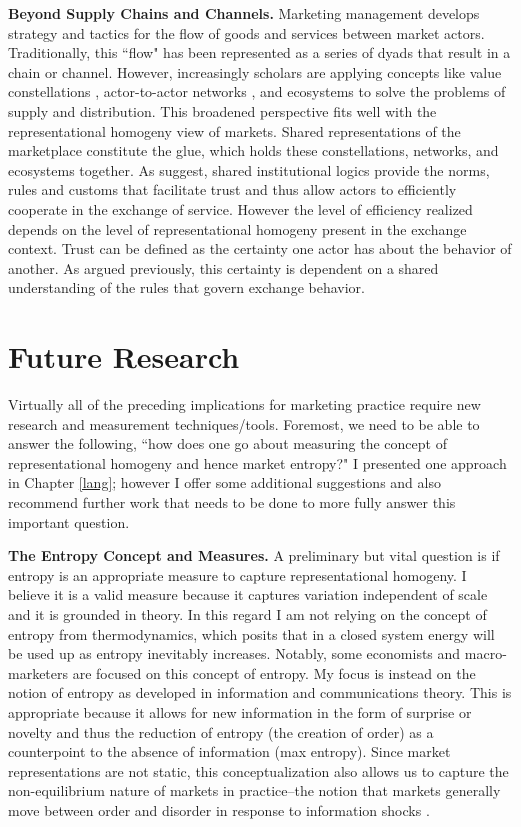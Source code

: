 \textbf{Beyond Supply Chains and Channels.}
Marketing management develops strategy and tactics for the flow of goods and services between market actors. Traditionally, this ``flow" has been represented as a series of dyads that result in a chain or channel. However, increasingly scholars are applying concepts like value constellations \citep{normann1993}, actor-to-actor networks \citep{vargo2011}, and ecosystems \citep{mars2012} to solve the problems of supply and distribution. This broadened perspective fits well with the representational homogeny view of markets. Shared representations of the marketplace constitute the glue, which holds these constellations, networks, and ecosystems together. As \citet{vargo2011} suggest, shared institutional logics provide the norms, rules and customs that facilitate trust and thus allow actors to efficiently cooperate in the exchange of service. However the level of efficiency realized depends on the level of representational homogeny present in the exchange context. Trust can be defined as the certainty one actor has about the behavior of another. As argued previously, this certainty is dependent on a shared understanding of the rules that govern exchange behavior. 

\section{Future Research}
Virtually all of the preceding implications for marketing practice require new research and measurement techniques/tools. Foremost, we need to be able to answer the following, ``how does one go about measuring the concept of representational homogeny and hence market entropy?" I presented one approach in Chapter \ref{lang}; however I offer some additional suggestions and also recommend further work that needs to be done to more fully answer this important question. 

\textbf{The Entropy Concept and Measures.}
A preliminary but vital question is if entropy is an appropriate measure to capture representational homogeny. I believe it is a valid measure because it captures variation independent of scale and it is grounded in theory. In this regard I am not relying on the concept of entropy from thermodynamics, which posits that in a closed system energy will be used up as entropy inevitably increases. Notably, some economists \citep[see e.g.][]{georgescu1971, rifkin1980} and macro-marketers \citep{kilbourne1997} are focused on this concept of entropy. My focus is instead on the notion of entropy as developed in information and communications theory. This is appropriate because it allows for new information in the form of surprise or novelty and thus the reduction of entropy (the creation of order) as a counterpoint to the absence of information (max entropy). Since market representations are not static, this conceptualization also allows us to capture the non-equilibrium nature of markets in practice--the notion that markets generally move between order and disorder in response to information shocks \citep{hunt1999, dickson1992}. 

